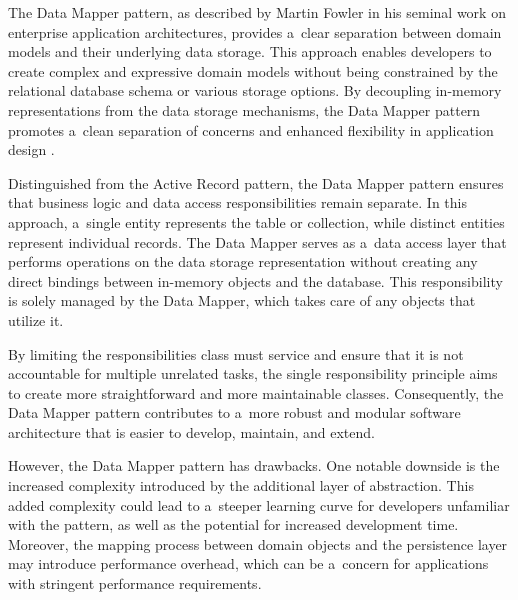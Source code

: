 The Data Mapper pattern, as described by Martin Fowler in his seminal work on
enterprise application architectures, provides a~clear separation between domain
models and their underlying data storage. This approach enables developers to
create complex and expressive domain models without being constrained by the
relational database schema or various storage options. By decoupling in-memory
representations from the data storage mechanisms, the Data Mapper pattern
promotes a~clean separation of concerns and enhanced flexibility in application
design \cite[p. 165]{fowler-patterns-2003}.

Distinguished from the Active Record pattern, the Data Mapper pattern ensures
that business logic and data access responsibilities remain separate. In this
approach, a~single entity represents the table or collection, while distinct
entities represent individual records. The Data Mapper serves as a~data access
layer that performs operations on the data storage representation without
creating any direct bindings between in-memory objects and the database. This
responsibility is solely managed by the Data Mapper, which takes care of any
objects that utilize it.

By limiting the responsibilities class must service and ensure that it is not
accountable for multiple unrelated tasks, the single responsibility principle
aims to create more straightforward and more maintainable classes. Consequently,
the Data Mapper pattern contributes to a~more robust and modular software
architecture that is easier to develop, maintain, and extend.

However, the Data Mapper pattern has drawbacks. One notable downside is the
increased complexity introduced by the additional layer of abstraction. This
added complexity could lead to a~steeper learning curve for developers
unfamiliar with the pattern, as well as the potential for increased development
time. Moreover, the mapping process between domain objects and the persistence
layer may introduce performance overhead, which can be a~concern for
applications with stringent performance requirements.
